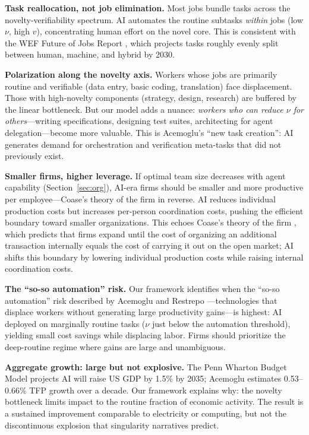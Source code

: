 \documentclass[11pt,a4paper]{article}
\begin{document}
\textbf{Task reallocation, not job elimination.} Most jobs bundle tasks across the novelty-verifiability spectrum. AI automates the routine subtasks \emph{within} jobs (low $\nu$, high $v$), concentrating human effort on the novel core. This is consistent with the WEF Future of Jobs Report \citep{wef2025}, which projects tasks roughly evenly split between human, machine, and hybrid by 2030.

\textbf{Polarization along the novelty axis.} Workers whose jobs are primarily routine and verifiable (data entry, basic coding, translation) face displacement. Those with high-novelty components (strategy, design, research) are buffered by the linear bottleneck. But our model adds a nuance: \emph{workers who can reduce $\nu$ for others}---writing specifications, designing test suites, architecting for agent delegation---become more valuable. This is Acemoglu's ``new task creation'': AI generates demand for orchestration and verification meta-tasks that did not previously exist.

\textbf{Smaller firms, higher leverage.} If optimal team size decreases with agent capability (Section~\ref{sec:org}), AI-era firms should be smaller and more productive per employee---Coase's theory of the firm in reverse. AI reduces individual production costs but increases per-person coordination costs, pushing the efficient boundary toward smaller organizations. This echoes Coase's theory of the firm \citep{coase1937}, which predicts that firms expand until the cost of organizing an additional transaction internally equals the cost of carrying it out on the open market; AI shifts this boundary by lowering individual production costs while raising internal coordination costs.

\textbf{The ``so-so automation'' risk.} Our framework identifies when the ``so-so automation'' risk described by Acemoglu and Restrepo \citep{acemoglu2019}---technologies that displace workers without generating large productivity gains---is highest: AI deployed on marginally routine tasks ($\nu$ just below the automation threshold), yielding small cost savings while displacing labor. Firms should prioritize the deep-routine regime where gains are large and unambiguous.

\textbf{Aggregate growth: large but not explosive.} The Penn Wharton Budget Model \citep{pennwharton2025} projects AI will raise US GDP by 1.5\% by 2035; Acemoglu estimates 0.53--0.66\% TFP growth over a decade. Our framework explains why: the novelty bottleneck limits impact to the routine fraction of economic activity. The result is a sustained improvement comparable to electricity or computing, but not the discontinuous explosion that singularity narratives predict.
\end{document}
